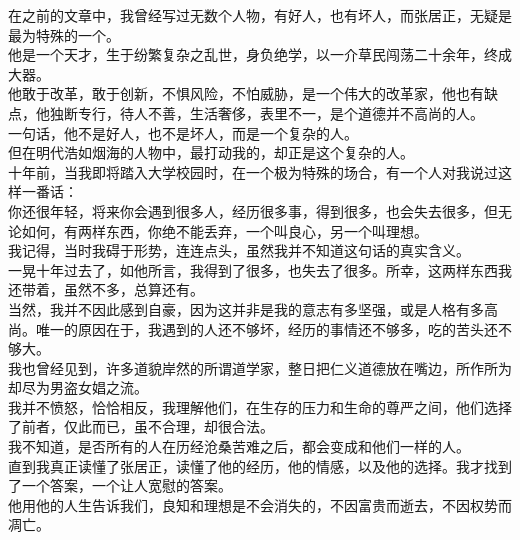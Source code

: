 \begin{multicols}{\theparacolNo}
在之前的文章中，我曾经写过无数个人物，有好人，也有坏人，而张居正，无疑是最为特殊的一个。\\

他是一个天才，生于纷繁复杂之乱世，身负绝学，以一介草民闯荡二十余年，终成大器。\\

他敢于改革，敢于创新，不惧风险，不怕威胁，是一个伟大的改革家，他也有缺点，他独断专行，待人不善，生活奢侈，表里不一，是个道德并不高尚的人。\\

一句话，他不是好人，也不是坏人，而是一个复杂的人。\\

但在明代浩如烟海的人物中，最打动我的，却正是这个复杂的人。\\

十年前，当我即将踏入大学校园时，在一个极为特殊的场合，有一个人对我说过这样一番话：\\

你还很年轻，将来你会遇到很多人，经历很多事，得到很多，也会失去很多，但无论如何，有两样东西，你绝不能丢弃，一个叫良心，另一个叫理想。\\

我记得，当时我碍于形势，连连点头，虽然我并不知道这句话的真实含义。\\

一晃十年过去了，如他所言，我得到了很多，也失去了很多。所幸，这两样东西我还带着，虽然不多，总算还有。\\

当然，我并不因此感到自豪，因为这并非是我的意志有多坚强，或是人格有多高尚。唯一的原因在于，我遇到的人还不够坏，经历的事情还不够多，吃的苦头还不够大。\\

我也曾经见到，许多道貌岸然的所谓道学家，整日把仁义道德放在嘴边，所作所为却尽为男盗女娼之流。\\

我并不愤怒，恰恰相反，我理解他们，在生存的压力和生命的尊严之间，他们选择了前者，仅此而已，虽不合理，却很合法。\\

我不知道，是否所有的人在历经沧桑苦难之后，都会变成和他们一样的人。\\

直到我真正读懂了张居正，读懂了他的经历，他的情感，以及他的选择。我才找到了一个答案，一个让人宽慰的答案。\\

他用他的人生告诉我们，良知和理想是不会消失的，不因富贵而逝去，不因权势而凋亡。\\


\end{multicols}
